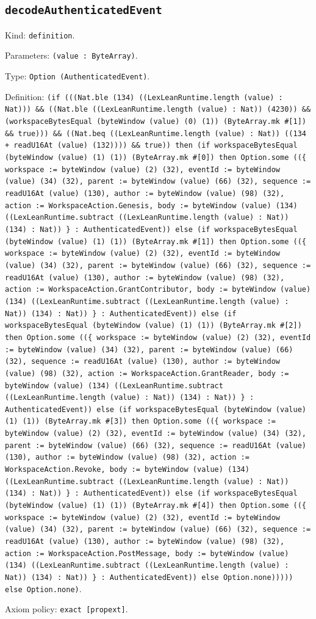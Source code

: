 \documentclass[11pt]{article}
\begin{document}
\subsection*{\texttt{decodeAuthenticatedEvent}}
\noindent Kind: \texttt{definition}.\par
\noindent Parameters: \texttt{(value : ByteArray)}.\par
\noindent Type: \texttt{Option (AuthenticatedEvent)}.\par
\noindent Definition: \texttt{(if (((Nat.ble (134) ((LexLeanRuntime.length (value) : Nat))) \&\& ((Nat.ble ((LexLeanRuntime.length (value) : Nat)) (4230)) \&\& (workspaceBytesEqual (byteWindow (value) (0) (1)) (ByteArray.mk \#[1]) \&\& true))) \&\& ((Nat.beq ((LexLeanRuntime.length (value) : Nat)) ((134 + readU16At (value) (132)))) \&\& true)) then (if workspaceBytesEqual (byteWindow (value) (1) (1)) (ByteArray.mk \#[0]) then Option.some ((\{ workspace := byteWindow (value) (2) (32), eventId := byteWindow (value) (34) (32), parent := byteWindow (value) (66) (32), sequence := readU16At (value) (130), author := byteWindow (value) (98) (32), action := WorkspaceAction.Genesis, body := byteWindow (value) (134) ((LexLeanRuntime.subtract ((LexLeanRuntime.length (value) : Nat)) (134) : Nat)) \} : AuthenticatedEvent)) else (if workspaceBytesEqual (byteWindow (value) (1) (1)) (ByteArray.mk \#[1]) then Option.some ((\{ workspace := byteWindow (value) (2) (32), eventId := byteWindow (value) (34) (32), parent := byteWindow (value) (66) (32), sequence := readU16At (value) (130), author := byteWindow (value) (98) (32), action := WorkspaceAction.GrantContributor, body := byteWindow (value) (134) ((LexLeanRuntime.subtract ((LexLeanRuntime.length (value) : Nat)) (134) : Nat)) \} : AuthenticatedEvent)) else (if workspaceBytesEqual (byteWindow (value) (1) (1)) (ByteArray.mk \#[2]) then Option.some ((\{ workspace := byteWindow (value) (2) (32), eventId := byteWindow (value) (34) (32), parent := byteWindow (value) (66) (32), sequence := readU16At (value) (130), author := byteWindow (value) (98) (32), action := WorkspaceAction.GrantReader, body := byteWindow (value) (134) ((LexLeanRuntime.subtract ((LexLeanRuntime.length (value) : Nat)) (134) : Nat)) \} : AuthenticatedEvent)) else (if workspaceBytesEqual (byteWindow (value) (1) (1)) (ByteArray.mk \#[3]) then Option.some ((\{ workspace := byteWindow (value) (2) (32), eventId := byteWindow (value) (34) (32), parent := byteWindow (value) (66) (32), sequence := readU16At (value) (130), author := byteWindow (value) (98) (32), action := WorkspaceAction.Revoke, body := byteWindow (value) (134) ((LexLeanRuntime.subtract ((LexLeanRuntime.length (value) : Nat)) (134) : Nat)) \} : AuthenticatedEvent)) else (if workspaceBytesEqual (byteWindow (value) (1) (1)) (ByteArray.mk \#[4]) then Option.some ((\{ workspace := byteWindow (value) (2) (32), eventId := byteWindow (value) (34) (32), parent := byteWindow (value) (66) (32), sequence := readU16At (value) (130), author := byteWindow (value) (98) (32), action := WorkspaceAction.PostMessage, body := byteWindow (value) (134) ((LexLeanRuntime.subtract ((LexLeanRuntime.length (value) : Nat)) (134) : Nat)) \} : AuthenticatedEvent)) else Option.none))))) else Option.none)}.\par
\noindent Axiom policy: \texttt{exact [propext]}.\par
\end{document}

